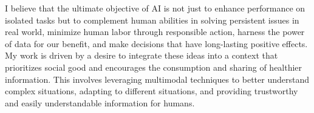 I believe that the ultimate objective of AI is not just to enhance performance on isolated tasks but to complement human abilities in solving persistent issues in real world, minimize human labor through responsible action, harness the power of data for our benefit, and make decisions that have long-lasting positive effects. My work is driven by a desire to integrate these ideas into a context that prioritizes social good and encourages the consumption and sharing of healthier information. This involves leveraging multimodal techniques to better understand complex situations, adapting to different situations, and providing trustworthy and easily understandable information for humans.


